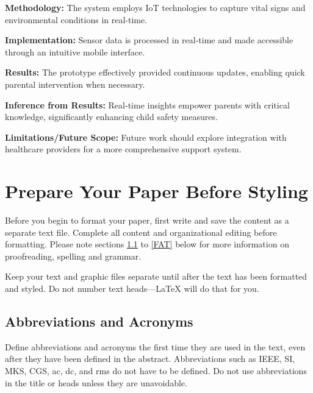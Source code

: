 \documentclass[conference]{IEEEtran}
\begin{document}
\textbf{Methodology:} The system employs IoT technologies to capture vital signs and environmental conditions in real-time.

\textbf{Implementation:} Sensor data is processed in real-time and made accessible through an intuitive mobile interface.

\textbf{Results:} The prototype effectively provided continuous updates, enabling quick parental intervention when necessary.

\textbf{Inference from Results:} Real-time insights empower parents with critical knowledge, significantly enhancing child safety measures.

\textbf{Limitations/Future Scope:} Future work should explore integration with healthcare providers for a more comprehensive support system.






\section{Prepare Your Paper Before Styling}
Before you begin to format your paper, first write and save the content as a 
separate text file. Complete all content and organizational editing before 
formatting. Please note sections \ref{AA} to \ref{FAT} below for more information on 
proofreading, spelling and grammar.

Keep your text and graphic files separate until after the text has been 
formatted and styled. Do not number text heads---{\LaTeX} will do that 
for you.

\subsection{Abbreviations and Acronyms}\label{AA}
Define abbreviations and acronyms the first time they are used in the text, 
even after they have been defined in the abstract. Abbreviations such as 
IEEE, SI, MKS, CGS, ac, dc, and rms do not have to be defined. Do not use 
abbreviations in the title or heads unless they are unavoidable.
\end{document}
